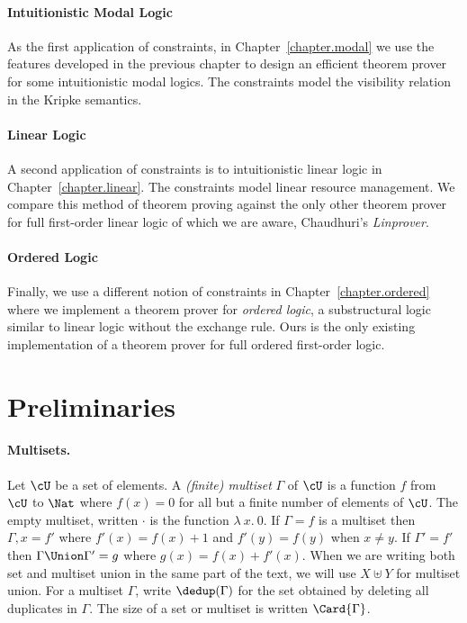 \paragraph{Intuitionistic Modal Logic}
As the first application of constraints, in Chapter~\ref{chapter.modal}
we use the features developed in the previous chapter to design an efficient
theorem prover for some intuitionistic modal logics.  The constraints model
the visibility relation in the Kripke semantics.

\paragraph{Linear Logic}
A second application of constraints is to intuitionistic linear logic in
Chapter~\ref{chapter.linear}.  The constraints model linear resource management.
We compare this method of theorem proving against the only other theorem prover
for full first-order linear logic of which we are aware, Chaudhuri's
\emph{Linprover}.

\paragraph{Ordered Logic}
Finally, we use a different notion of constraints in Chapter~\ref{chapter.ordered}
where we implement a theorem prover for \emph{ordered logic}, a substructural
logic similar to linear logic without the exchange rule.  Ours is the only
existing implementation of a theorem prover for full ordered first-order
logic.

\section{Preliminaries}

\paragraph{Multisets.}

Let $\cU$ be a set of elements.  A \emph{(finite) multiset} $\Gamma$ of $\cU$
is a function $f$ from
$\cU$ to $\Nat$ where $f(x)=0$ for all but a finite number of elements of
$\cU$.  The empty multiset, written $\cdot$ is the function $\lambda\ x.\ 0$.
If $\Gamma=f$ is a multiset then $\Gamma, x = f'$
where $f'(x) = f(x)+1$ and $f'(y)=f(y)$ when $x\neq y$.
If $\Gamma'=f'$ then $\Gamma\Union\Gamma' = g$ where
$g(x) = f(x)+f'(x)$.  When we are writing both set and multiset union
in the same part of the text, we will use $X \uplus Y$ for multiset union.
For a multiset $\Gamma$, write $\dedup(\Gamma)$ for the set obtained by deleting
all duplicates in $\Gamma$.
The size of a set or multiset is written $\Card{\Gamma}$.


